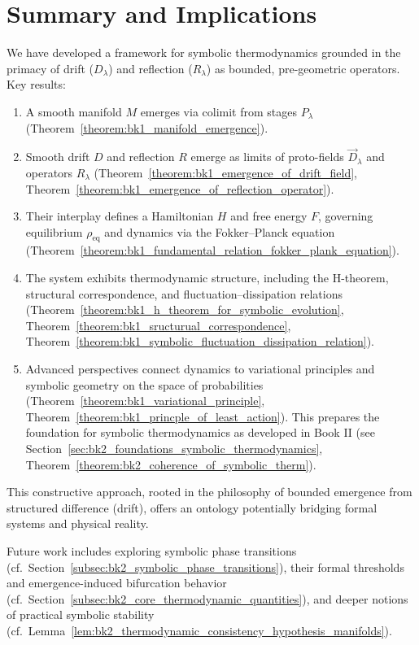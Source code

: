 \section{Summary and Implications}
\label{sec:bk1_summary_and_implications}
We have developed a framework for symbolic thermodynamics grounded in the primacy of drift ($D_\lambda$) and reflection ($R_\lambda$) as bounded, pre-geometric operators. Key results:
\begin{enumerate}
    \item A smooth manifold \( M \) emerges via colimit from stages \( P_\lambda \) (Theorem~\ref{theorem:bk1_manifold_emergence}).

    \item Smooth drift \( D \) and reflection \( R \) emerge as limits of proto-fields \( \vec{D}_\lambda \) and operators \( R_\lambda \) (Theorem~\ref{theorem:bk1_emergence_of_drift_field}, Theorem~\ref{theorem:bk1_emergence_of_reflection_operator}).

    \item Their interplay defines a Hamiltonian \( H \) and free energy \( F \), governing equilibrium \( \rho_{\text{eq}} \) and dynamics via the Fokker–Planck equation (Theorem~\ref{theorem:bk1_fundamental_relation_fokker_plank_equation}).

    \item The system exhibits thermodynamic structure, including the H-theorem, structural correspondence, and fluctuation–dissipation relations (Theorem~\ref{theorem:bk1_h_theorem_for_symbolic_evolution}, Theorem~\ref{theorem:bk1_sructurual_correspondence}, Theorem~\ref{theorem:bk1_symbolic_fluctuation_dissipation_relation}).

    \item Advanced perspectives connect dynamics to variational principles and symbolic geometry on the space of probabilities (Theorem~\ref{theorem:bk1_variational_principle}, Theorem~\ref{theorem:bk1_princple_of_least_action}). This prepares the foundation for symbolic thermodynamics as developed in Book II (see Section~\ref{sec:bk2_foundations_symbolic_thermodynamics}, Theorem~\ref{theorem:bk2_coherence_of_symbolic_therm}).
\end{enumerate}
This constructive approach, rooted in the philosophy of bounded emergence from structured difference (drift), offers an ontology potentially bridging formal systems and physical reality.

Future work includes exploring symbolic phase transitions (cf.~Section~\ref{subsec:bk2_symbolic_phase_transitions}), their formal thresholds and emergence-induced bifurcation behavior (cf.~Section~\ref{subsec:bk2_core_thermodynamic_quantities}), and deeper notions of practical symbolic stability (cf.~Lemma~\ref{lem:bk2_thermodynamic_consistency_hypothesis_manifolds}).

